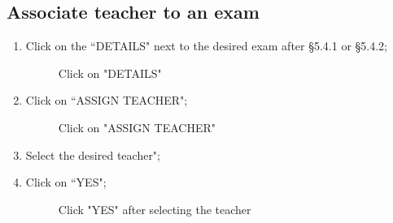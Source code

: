 \documentclass[ManualeUtente]{subfiles}
\begin{document}
\subsection{Associate teacher to an exam}
\begin{enumerate}
	\item Click on the \textquotedblleft DETAILS" next to the desired exam after \S 5.4.1 or \S 5.4.2;
	\begin{figure}[H]
		\centering
		\caption{Click on "DETAILS"}
		\label{fig:Click on "DETAILS"}
	\end{figure}
	\item Click on \textquotedblleft ASSIGN TEACHER";
	\begin{figure}[H]
		\centering
		\caption{Click on "ASSIGN TEACHER"}
		\label{fig:Click on "ASSIGN TEACHER"}
	\end{figure}
	\item Select the desired teacher";
	\item Click on \textquotedblleft YES";
	\begin{figure}[H]
		\centering
		\caption{Click "YES" after selecting the teacher}
		\label{fig:Click "YES" after selecting the teacher}
	\end{figure}
\end{enumerate}
\end{document}
